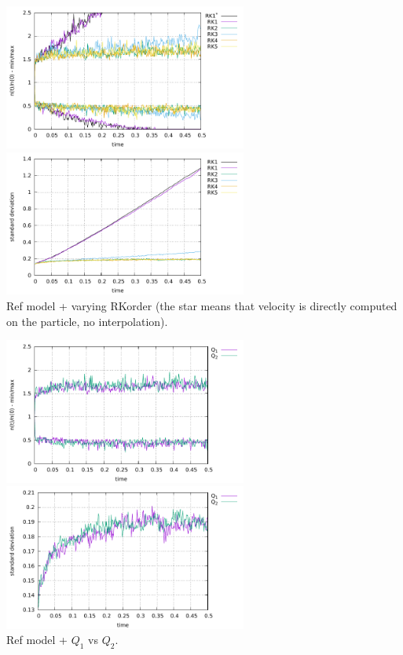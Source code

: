 \begin{center}
\includegraphics[width=8cm]{python_codes/fieldstone_30/results_streamline/markercount_rk12345}
\includegraphics[width=8cm]{python_codes/fieldstone_30/results_streamline/stdev_rk12345}\\
{\captionfont Ref model + varying RKorder (the star means that velocity 
is directly computed on the particle, no interpolation).}
\end{center} 


\begin{center}
\includegraphics[width=8cm]{python_codes/fieldstone_30/results_streamline/markercount_q12}
\includegraphics[width=8cm]{python_codes/fieldstone_30/results_streamline/stdev_q12}\\
{\captionfont Ref model + $Q_1$ vs $Q_2$. }
\end{center}

